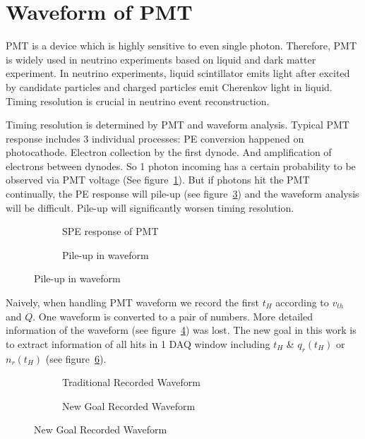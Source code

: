 \section{Waveform of PMT} %
PMT is a device which is highly sensitive to even single photon. Therefore, PMT is widely used in neutrino experiments based on liquid and dark matter experiment. In neutrino experiments, liquid scintillator emits light after excited by candidate particles and charged particles emit Cherenkov light in liquid. Timing resolution is crucial in neutrino event reconstruction. 

Timing resolution is determined by PMT and waveform analysis. Typical PMT response includes 3 individual processes: PE conversion happened on photocathode. Electron collection by the first dynode. And amplification of electrons between dynodes. So 1 photon incoming has a certain probability to be observed via PMT voltage (See figure~\ref{fig:spe}). But if photons hit the PMT continually, the PE response will pile-up (see figure~\ref{fig:pile}) and the waveform analysis will be difficult. Pile-up will significantly worsen timing resolution. 

\begin{figure}[H]
    \begin{subfigure}{0.5\textwidth}
        \centering
        \scalebox{0.4}{}
        \caption{\label{fig:spe} SPE response of PMT}
    \end{subfigure}
    \begin{subfigure}{0.5\textwidth}
        \centering
        \scalebox{0.4}{}
        \caption{\label{fig:pile} Pile-up in waveform}
    \end{subfigure}
\end{figure}

Naively, when handling PMT waveform we record the first $t_{H}$ according to $v_{th}$ and $Q$. One waveform is converted to a pair of numbers. More detailed information of the waveform (see figure~\ref{fig:tradi}) was lost. The new goal in this work is to extract information of all hits in 1 DAQ window including $t_{H}$ \& $q_{r}(t_{H})$ or $n_{r}(t_{H})$ (see figure~\ref{fig:new}). 

\begin{figure}[H]
    \begin{subfigure}{0.5\textwidth}
        \centering
        \scalebox{0.37}{}
        \caption{\label{fig:tradi} Traditional Recorded Waveform}
    \end{subfigure}
    \begin{subfigure}{0.5\textwidth}
        \centering
        \scalebox{0.37}{}
        \caption{\label{fig:new} New Goal Recorded Waveform}
    \end{subfigure}
\end{figure}

